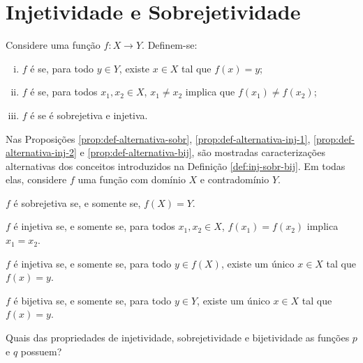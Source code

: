 \section{Injetividade e Sobrejetividade}

\begin{definition}
\label{def:inj-sobr-bij}
    Considere uma função $f: X \to Y$. Definem-se:
    \begin{enumerate}[(i)]
    \item $f$ é  se, para todo $y \in Y$, existe $x
    \in X$ tal que $f(x) = y$;
    \item $f$ é  se, para todos $x_1, x_2 \in X$, $x_1 \ne x_2$ implica que $f(x_1) \ne f(x_2)$;
    \item $f$ é  se é sobrejetiva e injetiva.
    \end{enumerate}
\end{definition}

Nas Proposições \ref{prop:def-alternativa-sobr}, \ref{prop:def-alternativa-inj-1}, \ref{prop:def-alternativa-inj-2} e \ref{prop:def-alternativa-bij}, são mostradas caracterizações alternativas dos conceitos introduzidos na Definição \ref{def:inj-sobr-bij}.
Em todas elas, considere $f$ uma função com domínio $X$ e contradomínio $Y$.
%
\begin{proposition}
\label{prop:def-alternativa-sobr}
    $f$ é sobrejetiva se, e somente se, $f(X) = Y$.
\end{proposition}

\begin{proposition}
\label{prop:def-alternativa-inj-1}
    $f$ é injetiva se, e somente se, para todos $x_1, x_2 \in X$, $f(x_1) = f(x_2)$ implica $x_1 = x_2$.
\end{proposition}

\begin{proposition}
\label{prop:def-alternativa-inj-2}
    $f$ é injetiva se, e somente se, para todo $y \in f(X)$, existe um único $x \in X$ tal que $f(x) = y$.
\end{proposition}

\begin{proposition}
\label{prop:def-alternativa-bij}
    $f$ é bijetiva se, e somente se, para todo $y \in Y$, existe um único $x \in X$ tal que $f(x) = y$.
\end{proposition}

\begin{example}
\label{ex:p-q-inj-sobr-bij}
    Quais das propriedades de injetividade, sobrejetividade e bijetividade as funções $p$ e $q$ possuem?
\end{example}

